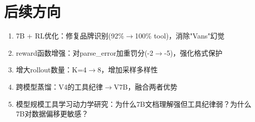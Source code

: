 \documentclass[fontset=none,11pt,a4paper]{ctexart}
\begin{document}
\section{后续方向}

\begin{enumerate}[nosep]
    \item 7B + RL优化：修复品牌识别(92\%$\to$100\% tool)，消除"Vans"幻觉
    \item reward函数增强：对parse\_error加重罚分(-2$\to$-5)，强化格式保护
    \item 增大rollout数量：K=4$\to$8，增加采样多样性
    \item 跨模型蒸馏：V4的工具纪律$\to$V7B，融合两者优势
    \item 模型规模工具学习动力学研究：为什么7B文档理解强但工具纪律弱？为什么7B对数据偏移更敏感？
\end{enumerate}
\end{document}
